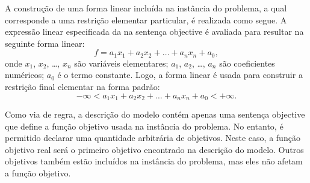 \documentclass[11pt, brazil]{report}
\begin{document}
A construção de uma forma linear incluída na instância do problema,
a qual corresponde a uma restrição elementar particular,
é realizada como segue. A expressão linear especificada da na
sentença objective é avaliada para resultar na seguinte forma linear:
$$f=a_1x_1+a_2x_2+\dots+a_nx_n+a_0,$$
onde $x_1$, $x_2$, \dots, $x_n$ são variáveis elementares; $a_1$, $a_2$,
\dots, $a_n$ são coeficientes numéricos; $a_0$ é o termo constante. Logo,
a forma linear é usada para construir a restrição final elementar na
forma padrão:
$$-\infty<a_1x_1+a_2x_2+\dots+a_nx_n+a_0<+\infty.$$

Como via de regra, a descrição do modelo contém apenas uma sentença objective
que define a função objetivo usada na instância do problema.
No entanto, é permitido declarar uma quantidade arbitrária de objetivos.
Neste caso, a função objetivo real será o primeiro objetivo
encontrado na descrição do modelo. Outros objetivos também estão
incluídos na instância do problema, mas eles não afetam a função
objetivo.



%
%
%
\end{document}
